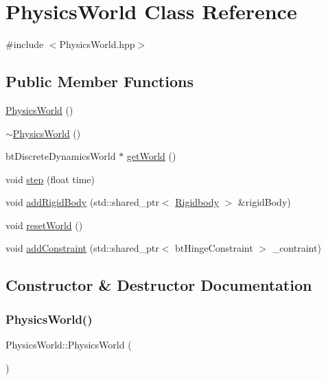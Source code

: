 \hypertarget{class_physics_world}{}\section{Physics\+World Class Reference}
\label{class_physics_world}


{\ttfamily \#include $<$Physics\+World.\+hpp$>$}

\subsection*{Public Member Functions}
\begin{DoxyCompactItemize}
\item 
\mbox{\hyperlink{class_physics_world_ae7aea476bf3c5d337a4fa5c1ff02f5d4}{Physics\+World}} ()
\item 
\mbox{\hyperlink{class_physics_world_abf1573b008b52b60a83a8f36cbdd51bc}{$\sim$\+Physics\+World}} ()
\item 
bt\+Discrete\+Dynamics\+World $\ast$ \mbox{\hyperlink{class_physics_world_a494deb5de66fb39a88ebccf48fc9c169}{get\+World}} ()
\item 
void \mbox{\hyperlink{class_physics_world_a37e286968a0f32f62d8a387253490a02}{step}} (float time)
\item 
void \mbox{\hyperlink{class_physics_world_aeef0fd2046bc496955484ec95570eb55}{add\+Rigid\+Body}} (std\+::shared\+\_\+ptr$<$ \mbox{\hyperlink{class_rigidbody}{Rigidbody}} $>$ \&rigid\+Body)
\item 
void \mbox{\hyperlink{class_physics_world_a99a91339a05c64b602031fe899245777}{reset\+World}} ()
\item 
void \mbox{\hyperlink{class_physics_world_a87bdd79dbd912e814980a9ef2108bfad}{add\+Constraint}} (std\+::shared\+\_\+ptr$<$ bt\+Hinge\+Constraint $>$ \+\_\+contraint)
\end{DoxyCompactItemize}


\subsection{Constructor \& Destructor Documentation}
\mbox{\label{class_physics_world_ae7aea476bf3c5d337a4fa5c1ff02f5d4}} 
\subsubsection{\texorpdfstring{Physics\+World()}{PhysicsWorld()}}
{\footnotesize\ttfamily Physics\+World\+::\+Physics\+World (\begin{DoxyParamCaption}{ }\end{DoxyParamCaption})}

